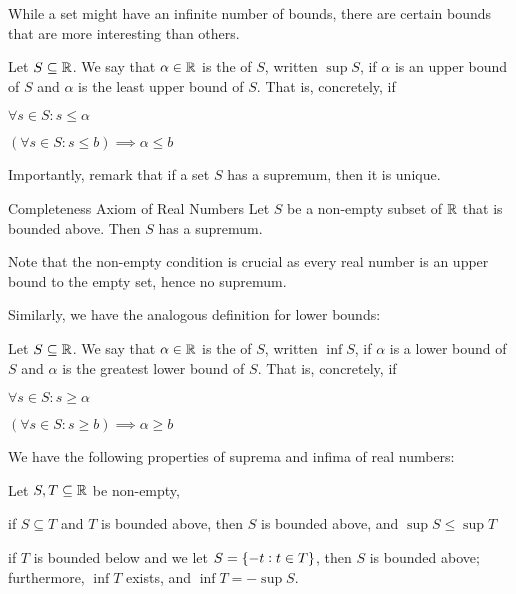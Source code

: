 \documentclass{styles/tufte}
\begin{document}
      While a set might have an infinite number of bounds, there are certain bounds that are more interesting than others.
      
      \begin{definition}{}{}
        Let $S \subseteq \mathbb{R}$. We say that $\alpha \in \mathbb{R}$ is the  of $S$, written $\sup S$, if $\alpha$ is an upper bound of $S$ and $\alpha$ is the least upper bound of $S$. That is, concretely, if
        \begin{romanenum}
          \item $\forall s \in S : s \leqslant \alpha$
          \item $(\forall s \in S : s \leqslant b) \implies \alpha \leqslant b$
        \end{romanenum}
      \end{definition}
      
      Importantly, remark that if a set $S$ has a supremum, then it is unique.
      
      \begin{axiom}{Completeness Axiom of Real Numbers}{}
        Let $S$ be a non-empty subset of $\mathbb{R}$ that is bounded above. Then $S$ has a supremum.
      \end{axiom}
      
      Note that the non-empty condition is crucial as every real number is an upper bound to the empty set, hence no supremum.
      
      Similarly, we have the analogous definition for lower bounds:
      
      \begin{definition}{}{}
        Let $S \subseteq \mathbb{R}$. We say that $\alpha \in \mathbb{R}$ is the  of $S$, written $\inf S$, if $\alpha$ is a lower bound of $S$ and $\alpha$ is the greatest lower bound of $S$. That is, concretely, if
        \begin{romanenum}
          \item $\forall s \in S : s \geqslant \alpha$
          \item $(\forall s \in S : s \geqslant b) \implies \alpha \geqslant b$
        \end{romanenum}
      \end{definition}
      
      We have the following properties of suprema and infima of real numbers:
      \begin{proposition}{}{}
        Let $S, T \subseteq \mathbb{R}$ be non-empty,
        \begin{romanenum}
          \item if $S \subseteq T$ and $T$ is bounded above, then $S$ is bounded above, and $\sup S \leqslant \sup T$
          \item if $T$ is bounded below and we let $S = \set{-t : t \in T}$, then $S$ is bounded above; furthermore, $\inf T$ exists, and $\inf T = -\sup S$.
        \end{romanenum}
      \end{proposition}
      
\end{document}
